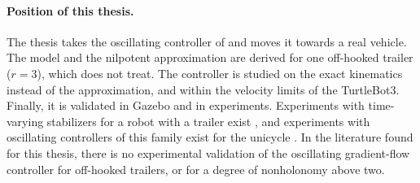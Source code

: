 \paragraph{Position of this thesis.}
The thesis takes the oscillating controller of \cite{zuyev2024} and moves it
towards a real vehicle. The model and the nilpotent approximation are derived
for one off-hooked trailer ($r=3$), which \cite{zuyev2024} does not treat. The
controller is studied on the exact kinematics instead of the approximation, and
within the velocity limits of the TurtleBot3. Finally, it is validated in
Gazebo and in experiments.
Experiments with time-varying stabilizers for a robot with a trailer exist
\cite{mccloskey1994}, and experiments with oscillating controllers of this
family exist for the unicycle \cite{zuyev2026implementation}. In the literature found for this thesis, there is no experimental validation of
the oscillating gradient-flow controller for off-hooked trailers, or for a
degree of nonholonomy above two.
